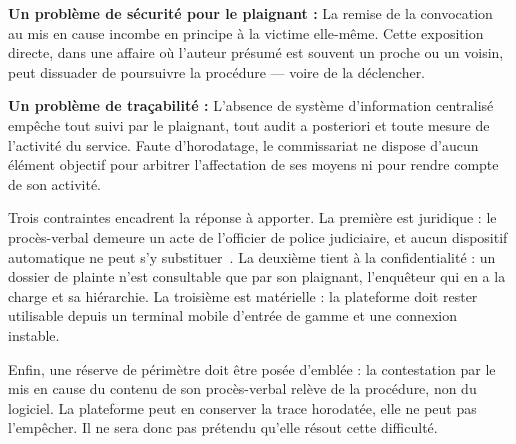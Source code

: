 \textbf{Un problème de sécurité pour le plaignant :} La remise de la convocation au mis en cause incombe en principe à la victime elle-même. Cette exposition directe, dans une affaire où l'auteur présumé est souvent un proche ou un voisin, peut dissuader de poursuivre la procédure — voire de la déclencher.

\textbf{Un problème de traçabilité :} L'absence de système d'information centralisé empêche tout suivi par le plaignant, tout audit a posteriori et toute mesure de l'activité du service. Faute d'horodatage, le commissariat ne dispose d'aucun élément objectif pour arbitrer l'affectation de ses moyens ni pour rendre compte de son activité.

Trois contraintes encadrent la réponse à apporter. La première est juridique : le procès-verbal demeure un acte de l'officier de police judiciaire, et aucun dispositif automatique ne peut s'y substituer~\cite{cameroun:cpp}. La deuxième tient à la confidentialité : un dossier de plainte n'est consultable que par son plaignant, l'enquêteur qui en a la charge et sa hiérarchie. La troisième est matérielle : la plateforme doit rester utilisable depuis un terminal mobile d'entrée de gamme et une connexion instable.

Enfin, une réserve de périmètre doit être posée d'emblée : la contestation par le mis en cause du contenu de son procès-verbal relève de la procédure, non du logiciel. La plateforme peut en conserver la trace horodatée, elle ne peut pas l'empêcher. Il ne sera donc pas prétendu qu'elle résout cette difficulté.
